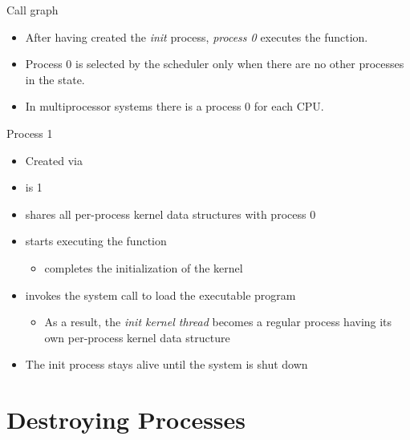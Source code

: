 \begin{frame}
  \begin{block}{Call graph}
    \begin{center}
    \end{center}
  \end{block}
  \begin{itemize}
  \item After having created the \emph{init} process, \emph{process 0} executes the
     function.
  \item Process 0 is selected by the scheduler only when there are no other processes in
    the  state.
  \item In multiprocessor systems there is a process 0 for each CPU.
  \end{itemize}
\end{frame}

\begin{frame}{Process 1}
  \begin{itemize}
  \item Created via \mbox{{\small {}}}
  \item {} is 1
  \item shares all per-process kernel data structures with process 0
  \item starts executing the  function
    \begin{itemize}
    \item completes the initialization of the kernel
    \end{itemize}
  \item {} invokes the  system call to load the executable
    program 
    \begin{itemize}
    \item As a result, the \emph{init kernel thread} becomes a regular process having its
      own per-process kernel data structure
    \end{itemize}
  \item The init process stays alive until the system is shut down
  \end{itemize}
\end{frame}

\section{Destroying Processes}
\label{sec:destroying-processes}

